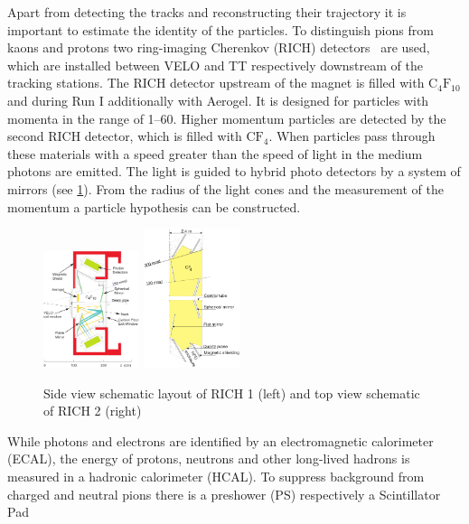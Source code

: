 Apart from detecting the tracks and reconstructing their trajectory it is
important to estimate the identity of the particles. To distinguish pions from
kaons and protons two ring-imaging Cherenkov (RICH)
detectors~\cite{LHCb-DP-2012-003} are used, which are installed between VELO
and TT respectively downstream of the tracking stations. The RICH detector
upstream of the magnet is filled with $\mathrm{C_4F_{10}}$ and during Run I
additionally with Aerogel. It is designed for particles with momenta in the
range of \SIrange{1}{60}{\gevc}. Higher momentum particles are detected by the
second RICH detector, which is filled with $\mathrm{CF_4}$. When particles
pass through these materials with a speed greater than the speed of light in
the medium photons are emitted. The light is guided to hybrid photo detectors
by a system of mirrors (see \cref{fig:detector:rich}). From the radius of the
light cones and the measurement of the momentum a particle hypothesis can be
constructed.
\begin{figure}[htb]
\centering
\includegraphics[width=0.25\textwidth]{04-Detector/figs/rich1-2d.pdf}
\includegraphics[width=0.25\textwidth]{04-Detector/figs/rich2_schematic.pdf}
\caption{Side view schematic layout of RICH 1 (left) and top view schematic of
RICH 2 (right)~\cite{Alves:2008zz}}
\label{fig:detector:rich}
\end{figure}
While photons and electrons are identified by an electromagnetic calorimeter
(ECAL), the energy of protons, neutrons and other long-lived hadrons is
measured in a hadronic calorimeter (HCAL). To suppress background from charged
and neutral pions there is a preshower (PS) respectively a Scintillator Pad
